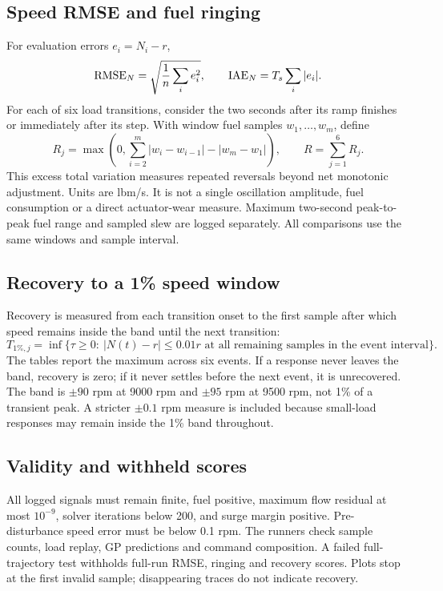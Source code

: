 \documentclass[11pt,a4paper]{article}
\begin{document}
\subsection{Speed RMSE and fuel ringing}
For evaluation errors $e_i=N_i-r$,
\begin{equation}
{\rm RMSE}_N=\sqrt{\frac1n\sum_i e_i^2},\qquad {\rm IAE}_N=T_s\sum_i|e_i|.
\end{equation}
For each of six load transitions, consider the two seconds after its ramp finishes or immediately after its step. With window fuel samples $w_1,\ldots,w_m$, define
\begin{equation}
R_j=\max\left(0,\sum_{i=2}^m|w_i-w_{i-1}|-|w_m-w_1|\right),\qquad R=\sum_{j=1}^6R_j.
\label{eq:ring}
\end{equation}
This excess total variation measures repeated reversals beyond net monotonic adjustment. Units are lbm/s. It is not a single oscillation amplitude, fuel consumption or a direct actuator-wear measure. Maximum two-second peak-to-peak fuel range and sampled slew are logged separately. All comparisons use the same windows and sample interval.

\subsection{Recovery to a 1\% speed window}
Recovery is measured from each transition onset to the first sample after which speed remains inside the band until the next transition:
\begin{equation}
T_{1\%,j}=\inf\{\tau\geq0:\ |N(t)-r|\leq0.01r
\text{ at all remaining samples in the event interval}\}.
\end{equation}
The tables report the maximum across six events. If a response never leaves the band, recovery is zero; if it never settles before the next event, it is unrecovered. The band is $\pm90$ rpm at 9000 rpm and $\pm95$ rpm at 9500 rpm, not 1\% of a transient peak. A stricter $\pm0.1$ rpm measure is included because small-load responses may remain inside the 1\% band throughout.

\subsection{Validity and withheld scores}
All logged signals must remain finite, fuel positive, maximum flow residual at most $10^{-9}$, solver iterations below 200, and surge margin positive. Pre-disturbance speed error must be below 0.1 rpm. The runners check sample counts, load replay, GP predictions and command composition. A failed full-trajectory test withholds full-run RMSE, ringing and recovery scores. Plots stop at the first invalid sample; disappearing traces do not indicate recovery.
\end{document}
